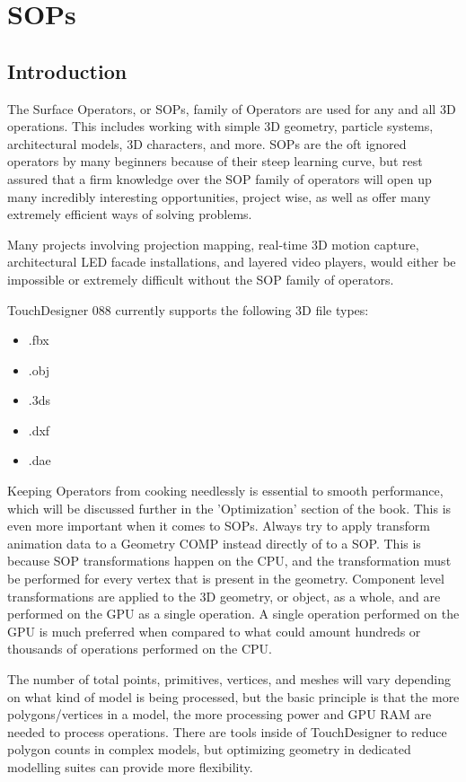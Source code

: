 \cleardoublepage
\chapter{SOPs}
\label{ch:6}


\section{Introduction}

\begin{fullwidth}

The Surface Operators, or SOPs, family of Operators are used for any and all 3D operations. This includes working with simple 3D geometry, particle systems, architectural models, 3D characters, and more. SOPs are the oft ignored operators by many beginners because of their steep learning curve, but rest assured that a firm knowledge over the SOP family of operators will open up many incredibly interesting opportunities, project wise, as well as offer many extremely efficient ways of solving problems.

Many projects involving projection mapping, real-time 3D motion capture, architectural LED facade installations, and layered video players, would either be impossible or extremely difficult without the SOP family of operators.

TouchDesigner 088 currently supports the following 3D file types:

\begin{itemize}
\item .fbx
\item .obj
\item .3ds
\item .dxf
\item .dae
\end{itemize}

Keeping Operators from cooking needlessly is essential to smooth performance, which will be discussed further in the 'Optimization' section of the book. This is even more important when it comes to SOPs. Always try to apply transform animation data to a Geometry COMP instead directly of to a SOP. This is because SOP transformations happen on the CPU, and the transformation must be performed for every vertex that is present in the geometry. Component level transformations are applied to the 3D geometry, or object, as a whole, and are performed on the GPU as a single operation. A single operation performed on the GPU is much preferred when compared to what could amount hundreds or thousands of operations performed on the CPU. 

The number of total points, primitives, vertices, and meshes will vary depending on what kind of model is being processed, but the basic principle is that the more polygons/vertices in a model, the more processing power and GPU RAM are needed to process operations. There are tools inside of TouchDesigner to reduce polygon counts in complex models, but optimizing geometry in dedicated modelling suites can provide more flexibility.

\end{fullwidth}



